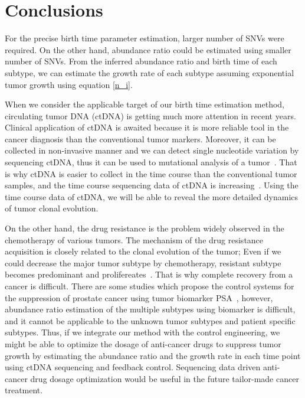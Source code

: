 \documentclass{article}
\begin{document}
\section{Conclusions}
 For the precise birth time parameter estimation, larger number of SNVs were required. On the other hand, abundance ratio could be estimated using smaller number of SNVs. From the inferred abundance ratio and birth time of each subtype, we can estimate the growth rate of each subtype assuming exponential tumor growth using equation \eqref{n_i}.

 When we consider the applicable target of our birth time estimation method, circulating tumor DNA (ctDNA) is getting much more attention in recent years.
 Clinical application of ctDNA is awaited because it is more reliable tool in the cancer diagnosis than the conventional tumor markers.
 Moreover, it can be collected in non-invasive manner and we can detect single nucleotide variation by sequencing ctDNA, thus it can be used to mutational analysis of a tumor~\cite{lohr2014whole}.
 That is why ctDNA is easier to collect in the time course than the conventional tumor samples, and the time course sequencing data of ctDNA is increasing~\cite{murtaza2013non}.
 Using the time course data of ctDNA, we will be able to reveal the more detailed dynamics of tumor clonal evolution.
 
 On the other hand, the drug resistance is the problem widely observed in the chemotherapy of various tumors. The mechanism of the drug resistance acquisition is closely related to the clonal evolution of the tumor; Even if we could decrease the major tumor subtype by chemotherapy, resistant subtype becomes predominant and prolifereates~\cite{landau2014clonal}.
 That is why complete recovery from a cancer is difficult. There are some studies which propose the control systems for the suppression of prostate cancer using tumor biomarker PSA~\cite{ideta2008mathematical}, however, abundance ratio estimation of the multiple subtypes using biomarker is difficult, and it cannot be applicable to the unknown tumor subtypes and patient specific subtypes.
 Thus, if we integrate our method with the control engineering, we might be able to optimize the dosage of anti-cancer drugs to suppress tumor growth by estimating the abundance ratio and the growth rate in each time point using ctDNA sequencing and feedback control.
 Sequencing data driven anti-cancer drug dosage optimization would be useful in the future tailor-made cancer treatment.
\end{document}
